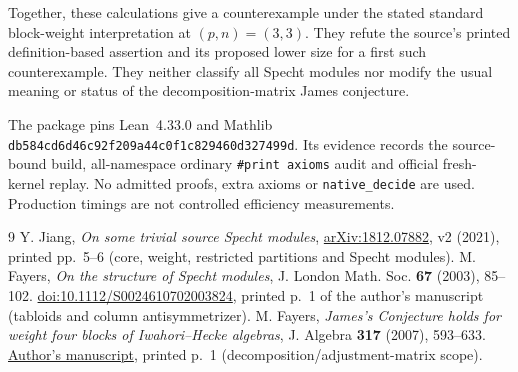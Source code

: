 \documentclass[10pt,a4paper]{article}
\begin{document}
Together, these calculations give a counterexample under the stated standard
block-weight interpretation at $(p,n)=(3,3)$. They refute the source's printed
definition-based assertion and its proposed lower size for a first such
counterexample. They neither classify all Specht modules nor modify the usual
meaning or status of the decomposition-matrix James conjecture.

The package pins Lean~4.33.0 and Mathlib
\texttt{db584cd6d46c92f209a44c0f1c829460d327499d}. Its evidence records the
source-bound build, all-namespace ordinary \texttt{\#print axioms} audit and
official fresh-kernel replay. No admitted proofs, extra axioms or
\texttt{native\_decide} are used. Production timings are not controlled
efficiency measurements.

\begin{thebibliography}{9}
 Y. Jiang, \emph{On some trivial source Specht modules},
\href{https://arxiv.org/abs/1812.07882}{arXiv:1812.07882}, v2 (2021),
printed pp.~5--6 (core, weight, restricted partitions and Specht modules).
 M. Fayers, \emph{On the structure of Specht modules},
J. London Math. Soc. \textbf{67} (2003), 85--102.
\href{https://doi.org/10.1112/S0024610702003824}{doi:10.1112/S0024610702003824},
printed p.~1 of the author's manuscript (tabloids and column antisymmetrizer).
 M. Fayers, \emph{James's Conjecture holds for weight four blocks
of Iwahori--Hecke algebras}, J. Algebra \textbf{317} (2007), 593--633.
\href{https://webspace.maths.qmul.ac.uk/m.fayers/papers/jcwt4.pdf}{Author's manuscript},
printed p.~1 (decomposition/adjustment-matrix scope).
\end{thebibliography}
\end{document}
